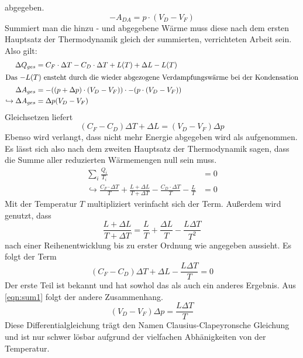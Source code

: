 abgegeben.
\begin{equation}
    -A_{DA} = p \cdot (V_D - V_F)
\end{equation}
Summiert man die hinzu - und abgegebene Wärme muss diese nach dem ersten Hauptsatz der Thermodynamik gleich der summierten, verrichteten Arbeit sein.
Also gilt:
\begin{align*}
     \Delta Q_{ges} &= C_F \cdot \Delta T - C_D \cdot \Delta T + L(T) + \Delta L - L(T) \\
     \intertext{Das $-L(T)$ ensteht durch die wieder abgezogene Verdampfungswärme bei der Kondensation}
    \Delta A_{ges} &= -((p+ \Delta p) \cdot (V_D-V_F)) \cdot -(p \cdot (V_D - V_F)) \\
    \hookrightarrow \Delta A_{ges} &= \Delta p (V_D - V_F) 
\end{align*}
Gleichsetzen liefert 
\begin{equation}
    \label{eqn:sum1}
    (C_F-C_D)\Delta T + \Delta L = (V_D - V_F) \Delta p
\end{equation}
Ebenso wird verlangt, dass nicht mehr Energie abgegeben wird als aufgenommen. Es lässt sich also nach dem zweiten Hauptsatz der Thermodynamik
sagen, dass die Summe aller reduzierten Wärmemengen null sein muss.
\begin{align}
\label{eqn:sum}
    \sum_i \frac{Q_i}{T_i} &= 0 \\
    \hookrightarrow \frac{C_F \cdot\Delta T}{T} + \frac{L + \Delta L}{T+ \Delta T}-\frac{C_D \cdot \Delta T}{T}-\frac{L}{T} &= 0
\end{align}
Mit der Temperatur $T$ multipliziert verinfacht sich der Term. Außerdem wird genutzt, dass 
\begin{equation*}
    \frac{L+ \Delta L}{T + \Delta T} = \frac{L}{T} + \frac{\Delta L}{T} - \frac{L \Delta T}{T^2}
\end{equation*}
nach einer Reihenentwicklung bis zu erster Ordnung wie angegeben aussieht. Es folgt der Term
\begin{equation}
    (C_F - C_D) \Delta T + \Delta L - \frac{L \Delta T}{T} = 0
\end{equation}
Der erste Teil ist bekannt und hat sowhol das als auch ein anderes Ergebnis. Aus \eqref{eqn:sum1} folgt der andere Zusammenhang.
\begin{equation}
    \label{eqn:dgl}
    (V_D-V_F) \Delta p = \frac{L \Delta T}{T}
\end{equation}  
Diese Differentialgleichung trägt den Namen Clausius-Clapeyronsche Gleichung und ist nur schwer lösbar aufgrund der vielfachen Abhänigkeiten von der 
Temperatur.

